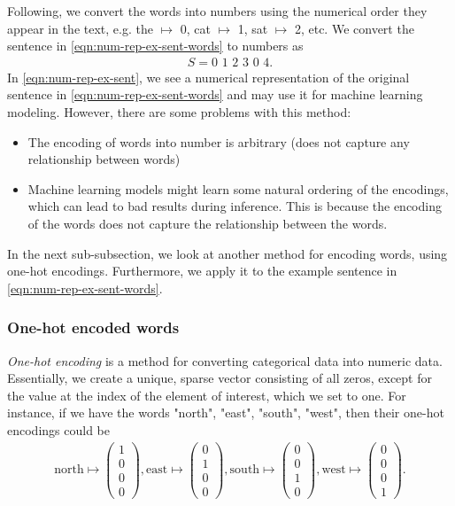 Following, we convert the words into numbers using the numerical order they appear in the text, e.g. the $\mapsto$ 0, cat $\mapsto$ 1, sat $\mapsto$ 2, etc. We convert the sentence in \cref{eqn:num-rep-ex-sent-words} to numbers as
\begin{align}
    S = \text{0 1 2 3 0 4}
    \label{eqn:num-rep-ex-sent}.
\end{align}
In \cref{eqn:num-rep-ex-sent}, we see a numerical representation of the original sentence in \cref{eqn:num-rep-ex-sent-words} and may use it for machine learning modeling. However, there are some problems with this method:
\begin{itemize}
    \item The encoding of words into number is arbitrary (does not capture any relationship between words)
    \item Machine learning models might learn some natural ordering of the encodings, which can lead to bad results during inference. This is because the encoding of the words does not capture the relationship between the words.
\end{itemize}

In the next sub-subsection, we look at another method for encoding words, using one-hot encodings. Furthermore, we apply it to the example sentence in \cref{eqn:num-rep-ex-sent-words}.

\subsubsection{One-hot encoded words}
\textit{One-hot encoding} is a method for converting categorical data into numeric data. Essentially, we create a unique, sparse vector consisting of all zeros, except for the value at the index of the element of interest, which we set to one. For instance, if we have the words "north", "east", "south", "west", then their one-hot encodings could be
\begin{align*}
    \text{north} \mapsto \begin{pmatrix}
    1\\
    0\\
    0\\
    0
    \end{pmatrix},
    \text{east} \mapsto \begin{pmatrix}
    0\\
    1\\
    0\\
    0
    \end{pmatrix},
    \text{south} \mapsto \begin{pmatrix}
    0\\
    0\\
    1\\
    0
    \end{pmatrix},
    \text{west} \mapsto \begin{pmatrix}
    0\\
    0\\
    0\\
    1
    \end{pmatrix}.
\end{align*}


